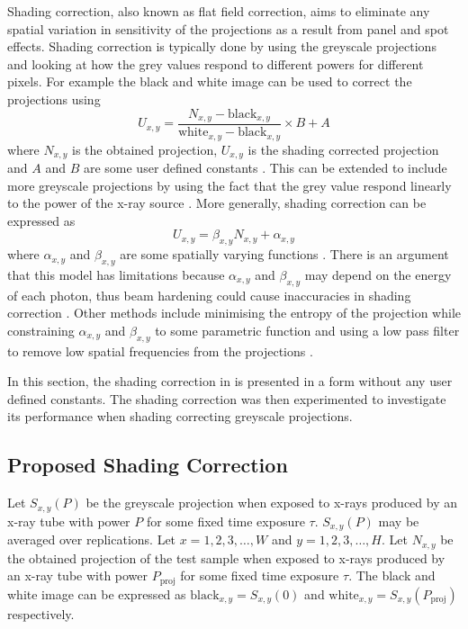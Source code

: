 Shading correction, also known as flat field correction, aims to eliminate any spatial variation in sensitivity of the projections as a result from panel and spot effects. Shading correction is typically done by using the greyscale projections and looking at how the grey values respond to different powers for different pixels. For example the black and white image can be used to correct the projections using
\begin{equation}
U_{x,y} = \dfrac{N_{x,y}-\text{black}_{x,y}}{\text{white}_{x,y}-\text{black}_{x,y}}\times B+A
\label{eq:data_shadingCorrectionOld}
\end{equation}
where $N_{x,y}$ is the obtained projection, $U_{x,y}$ is the shading corrected projection and $A$ and $B$ are some user defined constants \citep{young2000shading, munzenmayer2003enhancing}. This can be extended to include more greyscale projections by using the fact that the grey value respond linearly to the power of the x-ray source \citep{seibert1998flat}. More generally, shading correction can be expressed as
\begin{equation}
U_{x,y} = \beta_{x,y} N_{x,y} + \alpha_{x,y}
\end{equation}
where $\alpha_{x,y}$ and $\beta_{x,y}$ are some spatially varying functions \citep{munzenmayer2003enhancing}. There is an argument that this model has limitations because $\alpha_{x,y}$ and $\beta_{x,y}$ may depend on the energy of each photon, thus beam hardening could cause inaccuracies in shading correction \citep{davidson2003limitations}. Other methods include minimising the entropy of the projection while constraining $\alpha_{x,y}$ and $\beta_{x,y}$ to some parametric function \citep{likar2000retrospective} and using a low pass filter to remove low spatial frequencies from the projections \citep{young2000shading, munzenmayer2003enhancing}.

In this section, the shading correction in \cite{seibert1998flat} is presented in a form without any user defined constants. The shading correction was then experimented to investigate its performance when shading correcting greyscale projections.

\subsection{Proposed Shading Correction}

Let $S_{x,y}(P)$ be the greyscale projection when exposed to x-rays produced by an x-ray tube with power $P$ for some fixed time exposure $\tau$. $S_{x,y}(P)$ may be averaged over replications. Let $x=1,2,3,\dotsc, W$ and $y=1,2,3,\dotsc,H$. Let $N_{x,y}$ be the obtained projection of the test sample when exposed to x-rays produced by an x-ray tube with power $P_\text{proj}$ for some fixed time exposure $\tau$. The black and white image can be expressed as $\text{black}_{x,y}=S_{x,y}(0)$ and $\text{white}_{x,y}=S_{x,y}(P_\text{proj})$ respectively.

